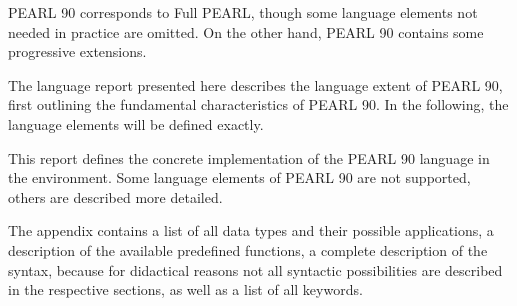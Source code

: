 PEARL 90 corresponds to Full PEARL, though some language elements not
needed in practice are omitted. On the other hand, PEARL 90 contains
some progressive extensions.

\begin{removed}
The language report presented here describes the language extent of
PEARL 90, first outlining the fundamental characteristics of PEARL 90.
In the following, the language elements will be defined exactly.
\end{removed}

\begin{added}
This report defines the concrete implementation of the PEARL 90
language in the \OpenPEARL{} environment. Some language elements of 
PEARL 90  are not supported, others are described more detailed.
\end{added}

The appendix contains a list of all data types and their possible
applications, a description of the available predefined functions, a
complete description of the syntax, because for didactical reasons not
all syntactic possibilities are described in the respective sections, as
well as a list of all keywords.

